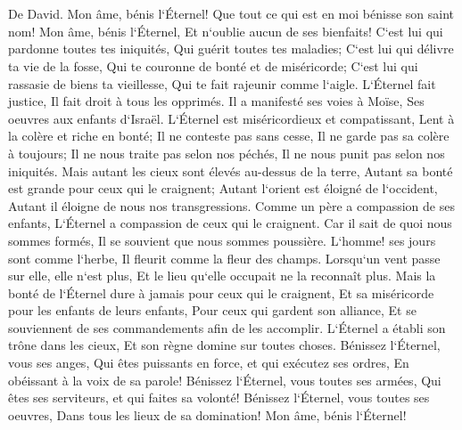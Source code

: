 \chapter{}

\verse De David. Mon âme, bénis l`Éternel! Que tout ce qui est en moi bénisse son saint nom! 
\verse Mon âme, bénis l`Éternel, Et n`oublie aucun de ses bienfaits! 
\verse C`est lui qui pardonne toutes tes iniquités, Qui guérit toutes tes maladies; 
\verse C`est lui qui délivre ta vie de la fosse, Qui te couronne de bonté et de miséricorde; 
\verse C`est lui qui rassasie de biens ta vieillesse, Qui te fait rajeunir comme l`aigle. 
\verse L`Éternel fait justice, Il fait droit à tous les opprimés. 
\verse Il a manifesté ses voies à Moïse, Ses oeuvres aux enfants d`Israël. 
\verse L`Éternel est miséricordieux et compatissant, Lent à la colère et riche en bonté; 
\verse Il ne conteste pas sans cesse, Il ne garde pas sa colère à toujours; 
\verse Il ne nous traite pas selon nos péchés, Il ne nous punit pas selon nos iniquités. 
\verse Mais autant les cieux sont élevés au-dessus de la terre, Autant sa bonté est grande pour ceux qui le craignent; 
\verse Autant l`orient est éloigné de l`occident, Autant il éloigne de nous nos transgressions. 
\verse Comme un père a compassion de ses enfants, L`Éternel a compassion de ceux qui le craignent. 
\verse Car il sait de quoi nous sommes formés, Il se souvient que nous sommes poussière. 
\verse L`homme! ses jours sont comme l`herbe, Il fleurit comme la fleur des champs. 
\verse Lorsqu`un vent passe sur elle, elle n`est plus, Et le lieu qu`elle occupait ne la reconnaît plus. 
\verse Mais la bonté de l`Éternel dure à jamais pour ceux qui le craignent, Et sa miséricorde pour les enfants de leurs enfants, 
\verse Pour ceux qui gardent son alliance, Et se souviennent de ses commandements afin de les accomplir. 
\verse L`Éternel a établi son trône dans les cieux, Et son règne domine sur toutes choses. 
\verse Bénissez l`Éternel, vous ses anges, Qui êtes puissants en force, et qui exécutez ses ordres, En obéissant à la voix de sa parole! 
\verse Bénissez l`Éternel, vous toutes ses armées, Qui êtes ses serviteurs, et qui faites sa volonté! 
\verse Bénissez l`Éternel, vous toutes ses oeuvres, Dans tous les lieux de sa domination! Mon âme, bénis l`Éternel! 

\chapter{}

